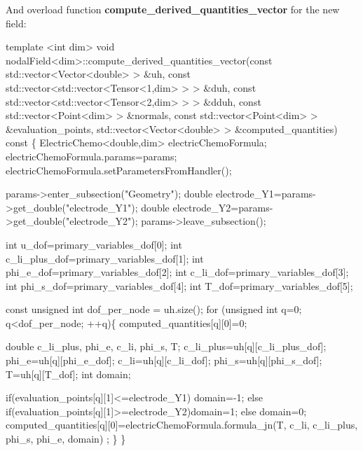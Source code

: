  And overload function {\bfseries compute\-\_\-derived\-\_\-quantities\-\_\-vector} for the new field\-: 
\begin{DoxyCode}
\textcolor{keyword}{template} <\textcolor{keywordtype}{int} dim>
\textcolor{keywordtype}{void} nodalField<dim>::compute\_derived\_quantities\_vector(\textcolor{keyword}{const} std::vector<Vector<double> > &uh,
                           \textcolor{keyword}{const} std::vector<std::vector<Tensor<1,dim> > > &duh,
                           \textcolor{keyword}{const} std::vector<std::vector<Tensor<2,dim> > > &dduh,
                           \textcolor{keyword}{const} std::vector<Point<dim> >                  &normals,
                           \textcolor{keyword}{const} std::vector<Point<dim> >                  &evaluation\_points,
                           std::vector<Vector<double> >                    &computed\_quantities)\textcolor{keyword}{ const}
\textcolor{keyword}{}\{
    ElectricChemo<double,dim> electricChemoFormula;
    electricChemoFormula.params=params;
    electricChemoFormula.setParametersFromHandler();

    params->enter\_subsection(\textcolor{stringliteral}{"Geometry"});
    \textcolor{keywordtype}{double} electrode\_Y1=params->get\_double(\textcolor{stringliteral}{"electrode\_Y1"});
    \textcolor{keywordtype}{double} electrode\_Y2=params->get\_double(\textcolor{stringliteral}{"electrode\_Y2"});
  params->leave\_subsection();
    
    \textcolor{keywordtype}{int} u\_dof=primary\_variables\_dof[0];
    \textcolor{keywordtype}{int} c\_li\_plus\_dof=primary\_variables\_dof[1];
    \textcolor{keywordtype}{int} phi\_e\_dof=primary\_variables\_dof[2];
    \textcolor{keywordtype}{int} c\_li\_dof=primary\_variables\_dof[3];
    \textcolor{keywordtype}{int} phi\_s\_dof=primary\_variables\_dof[4];
    \textcolor{keywordtype}{int} T\_dof=primary\_variables\_dof[5];
    
    \textcolor{keyword}{const} \textcolor{keywordtype}{unsigned} \textcolor{keywordtype}{int} dof\_per\_node = uh.size();
    \textcolor{keywordflow}{for} (\textcolor{keywordtype}{unsigned} \textcolor{keywordtype}{int} q=0; q<dof\_per\_node; ++q)\{
        computed\_quantities[q][0]=0;
        
        \textcolor{keywordtype}{double} c\_li\_plus, phi\_e, c\_li, phi\_s, T;
        c\_li\_plus=uh[q][c\_li\_plus\_dof];
        phi\_e=uh[q][phi\_e\_dof];
        c\_li=uh[q][c\_li\_dof];
        phi\_s=uh[q][phi\_s\_dof];
        T=uh[q][T\_dof];
        \textcolor{keywordtype}{int} domain;
        
        \textcolor{keywordflow}{if}(evaluation\_points[q][1]<=electrode\_Y1) domain=-1;
        \textcolor{keywordflow}{else} \textcolor{keywordflow}{if}(evaluation\_points[q][1]>=electrode\_Y2)domain=1;
        \textcolor{keywordflow}{else} domain=0;
        computed\_quantities[q][0]=electricChemoFormula.formula\_jn(T, c\_li, c\_li\_plus, phi\_s, phi\_e, domain)
      ;        
    \}   
\}
\end{DoxyCode}


